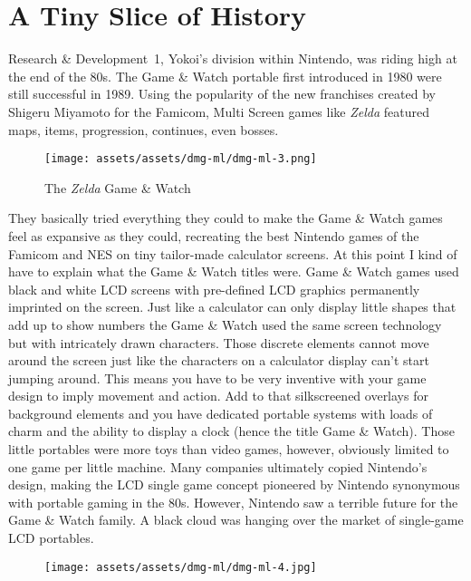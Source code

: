 \documentclass{book}
\begin{document}
\FloatBarrier\needspace{5pt}\section*{A Tiny Slice of History}\nopagebreak[4]

Research \& Development 1, Yokoi’s division within Nintendo, was riding high at the end of the 80s. The Game \& Watch portable first introduced in 1980 were still successful in 1989. Using the popularity of the new franchises created by Shigeru Miyamoto for the Famicom, Multi Screen games like \emph{Zelda} featured maps, items, progression, continues, even bosses.

\begin{figure}[hbt]
\vskip 10pt
\centering \texttt{[image: assets/assets/dmg-ml/dmg-ml-3.png]}\par\pagetwodescription The \emph{Zelda} Game \& Watch
\vskip 6pt
\end{figure}

They basically tried everything they could to make the Game \& Watch games feel as expansive as they could, recreating the best Nintendo games of the Famicom and NES on tiny tailor-made calculator screens. At this point I kind of have to explain what the Game \& Watch titles were. Game \& Watch games used black and white LCD screens with pre-defined LCD graphics permanently imprinted on the screen. Just like a calculator can only display little shapes that add up to show numbers the Game \& Watch used the same screen technology but with intricately drawn characters. Those discrete elements cannot move around the screen just like the characters on a calculator display can’t start jumping around. This means you have to be very inventive with your game design to imply movement and action. Add to that silkscreened overlays for background elements and you have dedicated portable systems with loads of charm and the ability to display a clock (hence the title Game \& Watch). Those little portables were more toys than video games, however, obviously limited to one game per little machine. Many companies ultimately copied Nintendo’s design, making the LCD single game concept pioneered by Nintendo synonymous with portable gaming in the 80s. However, Nintendo saw a terrible future for the Game \& Watch family. A black cloud was hanging over the market of single-game LCD portables.

\begin{figure}[hbt]
\vskip 10pt
\centering \texttt{[image: assets/assets/dmg-ml/dmg-ml-4.jpg]}
\vskip 6pt
\end{figure}
\end{document}
